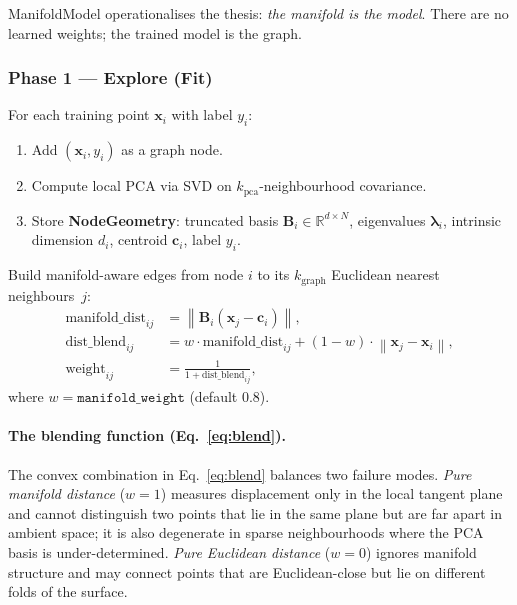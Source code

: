 \documentclass[12pt,letterpaper]{article}
\newcommand{\RR}{\mathbb{R}}
\newcommand{\bB}{\mathbf{B}}
\newcommand{\bx}{\mathbf{x}}
\newcommand{\bc}{\mathbf{c}}
\newcommand{\norm}[1]{\left\lVert#1\right\rVert}
\begin{document}
ManifoldModel operationalises the thesis: \emph{the manifold is the model}.
There are no learned weights; the trained model is the graph.

\subsubsection{Phase 1 --- Explore (Fit)}

For each training point $\bx_i$ with label $y_i$:
\begin{enumerate}[leftmargin=*]
  \item Add $(\bx_i, y_i)$ as a graph node.
  \item Compute local PCA via SVD on $k_\text{pca}$-neighbourhood covariance.
  \item Store \textbf{NodeGeometry}: truncated basis $\bB_i \in \RR^{d\times N}$,
    eigenvalues $\bm\lambda_i$, intrinsic dimension $d_i$, centroid
    $\bc_i$, label $y_i$.
\end{enumerate}

Build manifold-aware edges from node $i$ to its $k_\text{graph}$ Euclidean
nearest neighbours~$j$:
\begin{align}
  \text{manifold\_dist}_{ij} &= \norm{\bB_i(\bx_j - \bc_i)}, \label{eq:mdist}\\
  \text{dist\_blend}_{ij}    &= w\cdot\text{manifold\_dist}_{ij}
                                + (1-w)\cdot\norm{\bx_j-\bx_i}, \label{eq:blend}\\
  \text{weight}_{ij}         &= \frac{1}{1 + \text{dist\_blend}_{ij}},
  \label{eq:eweight}
\end{align}
where $w = \texttt{manifold\_weight}$ (default $0.8$).

\paragraph{The blending function (Eq.~\ref{eq:blend}).}
The convex combination in Eq.~\eqref{eq:blend} balances two failure modes.
\emph{Pure manifold distance} ($w{=}1$) measures displacement only in the local
tangent plane and cannot distinguish two points that lie in the same plane but
are far apart in ambient space; it is also degenerate in sparse neighbourhoods
where the PCA basis is under-determined.  \emph{Pure Euclidean distance}
($w{=}0$) ignores manifold structure and may connect points that are
Euclidean-close but lie on different folds of the surface.
\end{document}

